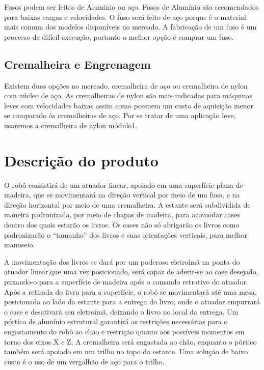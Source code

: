 Fusos podem ser feitos de Alumínio ou aço. Fusos de Alumínio são recomendados para  baixas cargas e velocidades. O fuso será feito de aço porque é o material mais comum dos modelos disponíveis no mercado. A fabricação de um fuso é um processo de difícil execução, portanto a melhor opção é comprar um fuso.

\subsection{Cremalheira e Engrenagem}

Existem duas opções no mercado, cremalheira de aço ou cremalheira de nylon com núcleo de aço. As cremalheiras de nylon são mais indicadas para máquinas leves com velocidades baixas assim como possuem um custo de aquisição menor se comparado às cremalheiras de aço. Por se tratar de uma aplicação leve, usaremos a cremalheira de nylon módulo1.

\section{Descrição do produto}

O robô consistirá de um atuador linear, apoiado em uma superfície plana de madeira, que se movimentará na direção vertical por meio de um fuso, e na direção horizontal por meio de uma cremalheira. A estante será subdividida de maneira padronizada, por meio de chapas de madeira, para acomodar cases dentro dos quais estarão os livros. Os cases não só abrigarão os livros como padronizarão o “tamanho” dos livros e suas orientações verticais, para melhor manuseio.

 A movimentação dos livros se dará por um poderoso eletroímã na ponta do atuador linear,que uma vez posicionado, será capaz de aderir-se ao case desejado, puxando-o para a superfície de madeira após o comando retrativo do atuador. Após a retirada do livro para a superfície, o robô se movimentará até uma mesa, posicionada ao lado da estante para a entrega do livro, onde o atuador empurrará o case e desativará seu eletroímã, deixando o livro no local da entrega. Um pórtico de alumínio estrutural garantirá as restrições necessárias para o engastamento do robô ao chão e restrição quanto aos possíveis momentos em torno dos eixos X e Z. A cremalheira será engastada ao chão, enquanto o pórtico também será apoiado em um trilho no topo da estante. Uma solução de baixo custo é o uso de um vergalhão de aço para o trilho.

